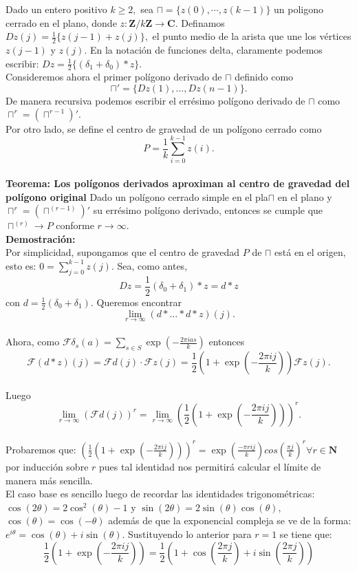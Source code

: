 \documentclass[a4paper,openright,10pt]{article}
\begin{document}
Dado un entero positivo $k\geq 2,$ sea $\sqcap= \{z(0),\cdots,z(k-1)\}$ un poligono cerrado en el plano, donde $z: \mathbf{Z}/k\mathbf{Z} \rightarrow \mathbf{C}.$ Definamos $Dz(j)=\frac{1}{2}\{z(j-1)+z(j)\},$ el punto medio de la arista que une los v\'ertices $z(j-1)$ y $z(j).$ En la notaci\'on de funciones delta, claramente podemos escribir: $Dz=\frac{1}{2}\{(\delta_{1}+\delta_{0})*z\}.$\\
Consideremos ahora el primer pol\'igono derivado de $\sqcap$ definido como $$
\sqcap '=\{Dz(1),\dots, Dz(n-1)\}
.$$ De manera recursiva podemos escribir el err\'esimo pol\'igono derivado de $\sqcap$ como $\sqcap ^{r}=(\sqcap ^{r-1})'.$\\
Por otro lado, se define el centro de gravedad de un pol\'igono cerrado como $$
P = \frac{1}{k} \sum\limits_{i=0}^{k-1} z(i).
$$\\
\textbf{Teorema: Los pol\'igonos derivados aproximan al centro de gravedad del pol\'igono original}
Dado un pol\'igono cerrado simple en el pla$\sqcap$ en el plano y $\sqcap ^{r}=(\sqcap ^{(r-1)})'$ su err\'esimo pol\'igono derivado, entonces se cumple que $
\sqcap ^{(r)} \rightarrow P
$ conforme $r\rightarrow \infty.$\\
\textbf{Demostraci\'on:}\\
Por simplicidad, supongamos que el centro de gravedad $P$ de $\sqcap$ est\'a en el origen, esto es: $0=\sum_{j=0}^{k-1} z(j).$
Sea, como antes, $$
Dz=\frac{1}{2}(\delta_{0}+\delta_{1})*z=d*z
$$ con $d=\frac{1}{2}(\delta_{0}+\delta_{1}).$ Queremos encontrar $$
\lim\limits_{r\rightarrow \infty}(d*\dots*d*z)(j).
$$\\
Ahora, como $\mathcal{F}\delta_{s}(a)=\sum\limits_{s\in S} \exp(-\frac{2\pi ias}{k})$ entonces $$
\mathcal{F}(d*z)(j)=\mathcal{F}d(j) \cdot \mathcal{F}z(j)=\frac{1}{2}(1+\exp(-\frac{2\pi ij}{k}))\mathcal{F}z(j).
$$\\
Luego $$
\lim\limits_{r\rightarrow \infty}(\mathcal{F}d(j)) ^{r} = \lim\limits_{r\rightarrow \infty} ({\frac{1}{2}(1+\exp(-\frac{2\pi ij}{k}))})^{r}.
$$\\
Probaremos que:
$({\frac{1}{2}(1+\exp(-\frac{2\pi ij}{k}))})^{r}=\exp(\frac{-\pi rij}{k}){cos(\frac{\pi j}{k})}^{r} \forall r \in \mathbf{N}$ por inducci\'on sobre $r$ pues tal identidad nos permitir\'a calcular el l\'imite de manera m\'as sencilla.\\
El caso base es sencillo luego de recordar las identidades trigonom\'etricas: $\cos (2\theta)=2\cos ^{2} (\theta)-1$ y $\sin(2\theta)=2\sin (\theta)\cos(\theta),$ $\cos(\theta)=\cos(-\theta)$ adem\'as de que la exponencial compleja se ve de la forma: $e^{i\theta}=\cos(\theta)+i\sin(\theta).$ Sustituyendo lo anterior para $r=1$ se tiene que: $$
\frac{1}{2}(1+\exp(-\frac{2\pi ij}{k}))=\frac{1}{2}(1+\cos(\frac{2\pi j}{k})+i\sin(\frac{2\pi j}{k}))$$
\end{document}
